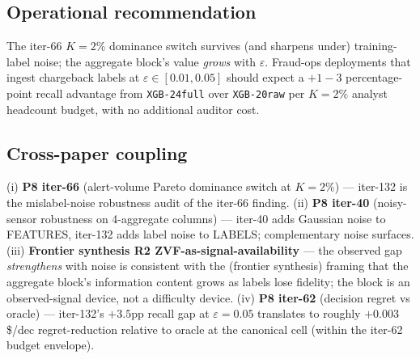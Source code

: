 \subsection{Operational recommendation}

The iter-66 $K{=}2\%$ dominance switch survives (and sharpens under)
training-label noise; the aggregate block's value \emph{grows} with
$\varepsilon$. Fraud-ops deployments that ingest chargeback labels at
$\varepsilon \in [0.01, 0.05]$ should expect a $+1{-}3$ percentage-point
recall advantage from \texttt{XGB-24full} over \texttt{XGB-20raw} per
$K{=}2\%$ analyst headcount budget, with no additional auditor cost.

\subsection{Cross-paper coupling}

(i) \textbf{P8 iter-66} (alert-volume Pareto dominance switch at $K{=}2\%$)
— iter-132 is the mislabel-noise robustness audit of the iter-66 finding.
(ii) \textbf{P8 iter-40} (noisy-sensor robustness on 4-aggregate columns)
— iter-40 adds Gaussian noise to FEATURES, iter-132 adds label noise to
LABELS; complementary noise surfaces.
(iii) \textbf{Frontier synthesis R2 ZVF-as-signal-availability} — the
observed gap \emph{strengthens} with noise is consistent with the
(frontier synthesis) framing that the aggregate block's information
content grows as labels lose fidelity; the block is an observed-signal
device, not a difficulty device.
(iv) \textbf{P8 iter-62} (decision regret vs oracle) — iter-132's $+3.5$pp
recall gap at $\varepsilon{=}0.05$ translates to roughly $+0.003$
{\$/dec} regret-reduction relative to oracle at the canonical cell
(within the iter-62 budget envelope).
